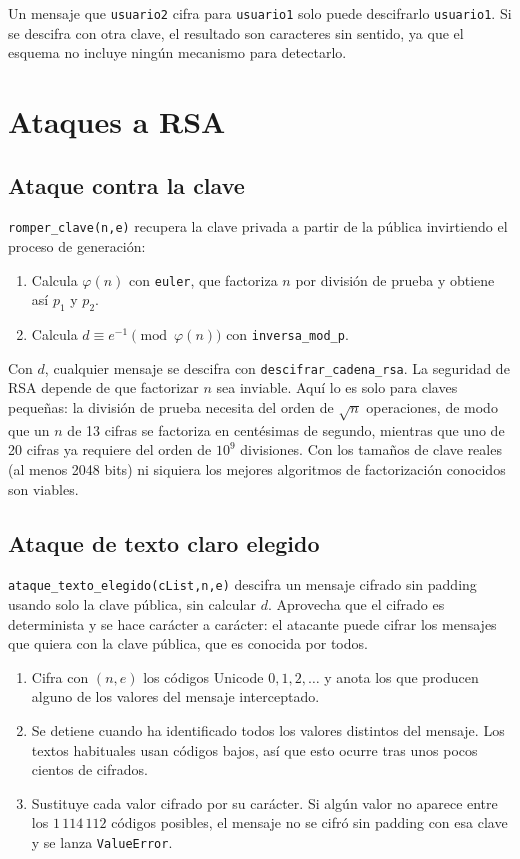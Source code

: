\documentclass[11pt,a4paper]{article}
\newcommand{\code}[1]{\texttt{#1}}
\begin{document}
Un mensaje que \code{usuario2} cifra para \code{usuario1} solo puede descifrarlo \code{usuario1}. Si se descifra con otra clave, el resultado son caracteres sin sentido, ya que el esquema no incluye ningún mecanismo para detectarlo.

\section{Ataques a RSA}

\subsection{Ataque contra la clave}

\code{romper\_clave(n,e)} recupera la clave privada a partir de la pública invirtiendo el proceso de generación:

\begin{enumerate}
\item Calcula $\varphi(n)$ con \code{euler}, que factoriza $n$ por división de prueba y obtiene así $p_1$ y $p_2$.
\item Calcula $d\equiv e^{-1} \pmod{\varphi(n)}$ con \code{inversa\_mod\_p}.
\end{enumerate}

Con $d$, cualquier mensaje se descifra con \code{descifrar\_cadena\_rsa}. La seguridad de RSA depende de que factorizar $n$ sea inviable. Aquí lo es solo para claves pequeñas: la división de prueba necesita del orden de $\sqrt{n}$ operaciones, de modo que un $n$ de 13 cifras se factoriza en centésimas de segundo, mientras que uno de 20 cifras ya requiere del orden de $10^{9}$ divisiones. Con los tamaños de clave reales (al menos 2048 bits) ni siquiera los mejores algoritmos de factorización conocidos son viables.

\subsection{Ataque de texto claro elegido}
\label{sec:ataque-texto}

\code{ataque\_texto\_elegido(cList,n,e)} descifra un mensaje cifrado sin padding usando solo la clave pública, sin calcular $d$. Aprovecha que el cifrado es determinista y se hace carácter a carácter: el atacante puede cifrar los mensajes que quiera con la clave pública, que es conocida por todos.

\begin{enumerate}
\item Cifra con $(n,e)$ los códigos Unicode $0,1,2,\dots$ y anota los que producen alguno de los valores del mensaje interceptado.
\item Se detiene cuando ha identificado todos los valores distintos del mensaje. Los textos habituales usan códigos bajos, así que esto ocurre tras unos pocos cientos de cifrados.
\item Sustituye cada valor cifrado por su carácter. Si algún valor no aparece entre los $1\,114\,112$ códigos posibles, el mensaje no se cifró sin padding con esa clave y se lanza \code{ValueError}.
\end{enumerate}
\end{document}
